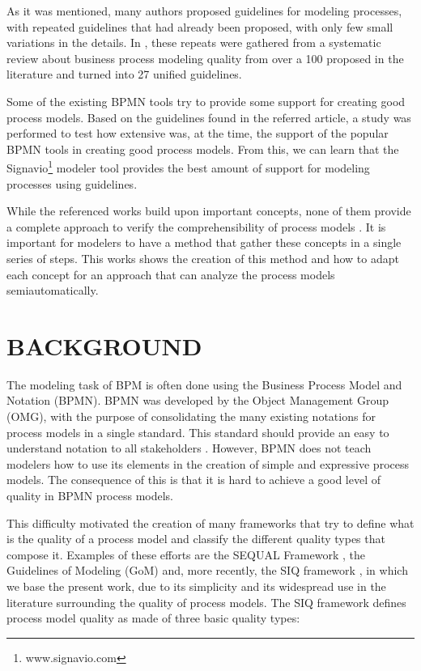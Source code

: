 \documentclass[a4paper,twoside]{article}
\begin{document}
As it was mentioned, many authors proposed guidelines for modeling processes, with repeated guidelines that had already been proposed, with only few small variations in the details. In \citet{Moreno-MontesdeOca2014}, these repeats were gathered from a systematic review about business process modeling quality from over a 100 proposed in the literature and turned into 27 unified guidelines.  

Some of the existing BPMN tools try to provide some support for creating good process models. Based on the guidelines found in the referred article, a study \citep{MoniqueSnoeckIsel2015} was performed to test how extensive was, at the time, the support of the popular BPMN tools in creating good process models. From this, we can learn that the Signavio\footnote{www.signavio.com} modeler tool provides the best amount of support for modeling processes using guidelines. 

While the referenced works build upon important concepts, none of them provide a complete approach to verify the comprehensibility of process models . It is important for modelers to have a method that gather these concepts in a single series of steps. This works shows the creation of this method and how to adapt each concept for an approach that can analyze the process models semiautomatically. 


\section{BACKGROUND}\label{Fundamentals}\label{Background}

\noindent The modeling task of BPM is often done using the Business Process Model and Notation (BPMN). BPMN was developed by the Object Management Group (OMG), with the purpose of consolidating the many existing notations for process models in a single standard. This standard should provide an easy to understand notation to all stakeholders \citep{OMGObjectManagementGroup2015}. However, BPMN does not teach modelers how to use its elements in the creation of simple and expressive process models. The consequence of this is that it is hard to achieve a good level of quality in BPMN process models.


This difficulty motivated the creation of many frameworks that try to define what is the quality of a process model and classify the different quality types that compose it. Examples of these efforts are the SEQUAL Framework \citep{krogstie2012}, the Guidelines of Modeling (GoM) \citep{Schuette1998} and, more recently, the SIQ framework \citep{Reijers2015}, in which we base the present work, due to its simplicity and its widespread use in the literature surrounding the quality of process models. The SIQ framework defines process model quality as made of three basic quality types:
\end{document}
